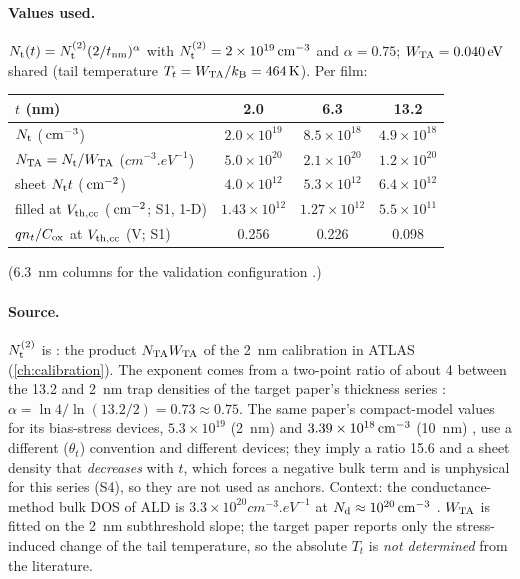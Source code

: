 \paragraph{Values used.}
$N_{\mathrm{t}}(t) = N_{\mathrm{t}}^{(2)}(2/t_{\mathrm{nm}})^{\alpha}$ with $N_{\mathrm{t}}^{(2)} = 2\times10^{19}\,\mathrm{cm}^{-3}$ and $\alpha = 0.75$;
$W_{\mathrm{TA}} = \SI{0.040}{eV}$ shared (tail temperature $T_t = W_{\mathrm{TA}}/k_{\mathrm{B}} = \SI{464}{K}$). Per film:
\begin{center}\small
\begin{tabular}{lccc}
  \toprule
  $t$ (nm) & 2.0 & 6.3 & 13.2 \\
  \midrule
  $N_{\mathrm{t}}$ ($\,\mathrm{cm}^{-3}$) & $2.0\times10^{19}$ & $8.5\times10^{18}$ & $4.9\times10^{18}$ \\
  $N_{\mathrm{TA}} = N_{\mathrm{t}}/W_{\mathrm{TA}}$ ($\si{cm^{-3}.eV^{-1}}$) & $5.0\times10^{20}$ & $2.1\times10^{20}$ & $1.2\times10^{20}$ \\
  sheet $N_{\mathrm{t}} t$ ($\,\mathrm{cm}^{-2}$) & $4.0\times10^{12}$ & $5.3\times10^{12}$ & $6.4\times10^{12}$ \\
  filled at $V_{\mathrm{th,cc}}$ ($\,\mathrm{cm}^{-2}$; S1, 1-D) & $1.43\times10^{12}$ & $1.27\times10^{12}$ & $5.5\times10^{11}$ \\
  $q n_t/C_{\mathrm{ox}}$ at $V_{\mathrm{th,cc}}$ (V; S1) & 0.256 & 0.226 & 0.098 \\
  \bottomrule
\end{tabular}
\end{center}
(6.3~nm columns for the validation configuration .)

\paragraph{Source.}
$N_{\mathrm{t}}^{(2)}$ is : the product $N_{\mathrm{TA}}W_{\mathrm{TA}}$ of the 2~nm calibration in ATLAS (\cref{ch:calibration}).
The exponent comes from a two-point ratio of about 4 between the 13.2 and 2~nm trap densities of the target
paper's thickness series \citep[Sec.~2.8, Fig.~5a, p.~7]{Januar2026}: $\alpha = \ln 4/\ln(13.2/2) = 0.73 \approx 0.75$.
The same paper's compact-model values for its bias-stress devices, $5.3\times10^{19}$ (2~nm) and
$3.39\times10^{18}\,\mathrm{cm}^{-3}$ (10~nm) \citep[p.~9]{Januar2026}, use a different ($\theta_t$) convention and different
devices; they imply a ratio 15.6 and a sheet density that \emph{decreases} with $t$, which forces a negative
bulk term and is unphysical for this series (S4), so they are not used as anchors. Context: the conductance-method
bulk DOS of ALD \InO{} is $3.3\times10^{20}\si{cm^{-3}.eV^{-1}}$ at $N_{\mathrm{d}} \approx 10^{20}\,\mathrm{cm}^{-3}$
\citep[pp.~4--5]{Wang2022}. $W_{\mathrm{TA}}$ is fitted on the 2~nm subthreshold slope; the target paper reports only the
stress-induced change of the tail temperature, so the absolute $T_t$ is \emph{not determined} from the literature.

